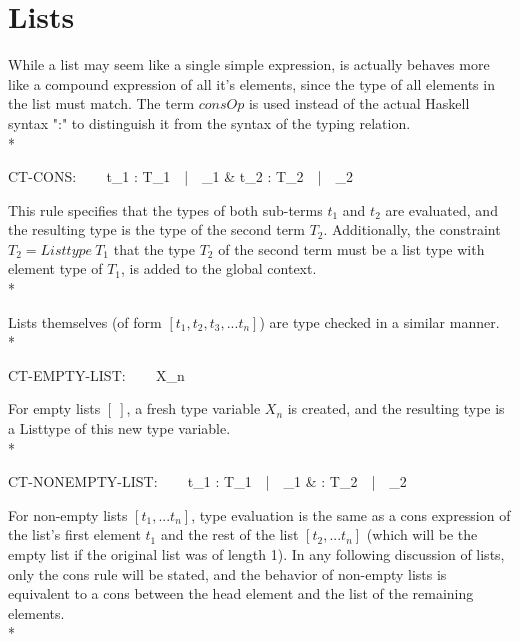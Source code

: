 \documentclass[11pt]{article}
\begin{document}
\section*{Lists } 

While a list may seem like a single simple expression, is actually behaves more like a compound expression of all it's elements, since the type of all elements in the list must match.
The term $consOp$ is used instead of the actual Haskell syntax ":" to distinguish it from the syntax of the typing relation.\\*
 
CT-CONS:
\ \ \ 
    {\Gamma \vdash t_{1} : T_{1}\ \ |\ \ _{1}
    & \Gamma \vdash t_{2} : T_{2}\ \ |\ \ _{2}
    }
\bigskip
    
This rule specifies that the types of both sub-terms $t_{1}$ and $t_{2}$ are evaluated, and the resulting type is the type of the second term $T_{2}$. Additionally, the constraint $T_{2} = Listtype\ T_{1}$ that the type $T_{2}$ of the second term must be a list type with element type of $T_{1}$, is added to the global context.\\*

Lists themselves (of form $[t_{1}, t_{2}, t_{3}, ...t_{n}]$) are type checked in a similar manner. \\* 

CT-EMPTY-LIST:
\ \ \ 
    {X_{n} }
\bigskip
    
For empty lists $[\ ]$, a fresh type variable $X_{n}$ is created, and the resulting type is a Listtype of this new type variable.\\*
    
CT-NONEMPTY-LIST:
\ \ \ 
    {\Gamma \vdash t_{1} : T_{1}\ \ |\ \ _{1}
    & \Gamma \vdash [t_{2}, ... t_{n}] : T_{2}\ \ |\ \ _{2}
    }
\bigskip

For non-empty lists $[t_{1}, ... t_{n}]$, type evaluation is the same as a cons expression of the list's first element $t_{1}$ and the rest of the list $[t_{2}, ... t_{n}]$ (which will be the empty list if the original list was of length 1).  In any following discussion of lists, only the cons rule will be stated, and the behavior of non-empty lists is equivalent to a cons between the head element and the list of the remaining elements.\\* 
\end{document}
